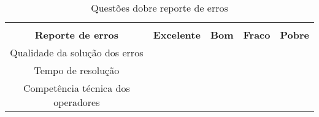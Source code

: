 \begin{table}[htb]
\centering
\caption{Questões dobre reporte de erros}
\label{my-label}
\begin{tabular}{cl|c|c|c|c|}
\cline{3-6}
\multicolumn{1}{l}{}                              &                              & \cellcolor[HTML]{9AFF99}                                     & \cellcolor[HTML]{9AFF99}                               & \cellcolor[HTML]{9AFF99}                                 & \cellcolor[HTML]{9AFF99}                                 \\ \cline{1-2}
\multicolumn{2}{|c|}{\cellcolor[HTML]{FFFC9E}\textbf{Reporte de erros}}          & \multirow{-2}{*}{\cellcolor[HTML]{9AFF99}\textbf{Excelente}} & \multirow{-2}{*}{\cellcolor[HTML]{9AFF99}\textbf{Bom}} & \multirow{-2}{*}{\cellcolor[HTML]{9AFF99}\textbf{Fraco}} & \multirow{-2}{*}{\cellcolor[HTML]{9AFF99}\textbf{Pobre}} \\ \hline
\multicolumn{2}{|c|}{\cellcolor[HTML]{FFFFC7}Qualidade da solução dos erros}     &                                                              &                                                        &                                                          &                                                          \\ \hline
\multicolumn{2}{|c|}{\cellcolor[HTML]{FFFFC7}Tempo de resolução}                 &                                                              &                                                        &                                                          &                                                          \\ \hline
\multicolumn{2}{|c|}{\cellcolor[HTML]{FFFFC7}Competência técnica dos operadores} &                                                              &                                                        &                                                          &                                                          \\ \hline
\end{tabular}
\end{table}
